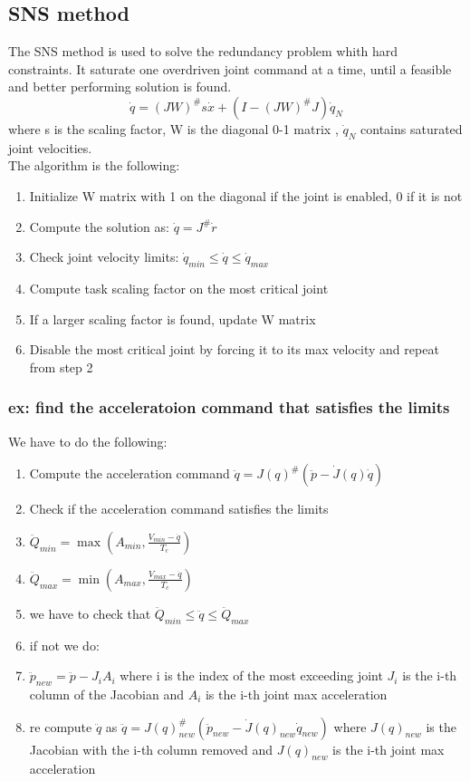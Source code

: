 \documentclass[a4paper,12pt]{article}
\begin{document}
\subsection{SNS method}
The SNS method is used to solve the redundancy 
problem whith hard constraints. It saturate one overdriven joint command at a time, until a feasible and better
performing solution is found.
\begin{equation}
    \dot{q} = (JW)^{\#} s\dot{x} + (I - (JW)^{\#}J) \dot{q}_N
\end{equation}
where s is the scaling factor,  W is the diagonal 0-1 matrix
 , $\dot{q}_N$ contains
 saturated
 joint velocities.\\
The algorithm is the following:
\begin{enumerate}
    \item Initialize W matrix with 1 on the diagonal if the joint is enabled, 0 if it is not
    \item Compute the solution as: $\dot{q} = J^\# \dot{r}$
    \item Check joint velocity limits: $\dot{q}_{min} \leq \dot{q} \leq \dot{q}_{max}$
    \item Compute task scaling factor on the most critical joint
    \item If a larger scaling factor is found, update W matrix
    \item Disable the most critical joint by forcing it to its max velocity and repeat from step 2
\end{enumerate}
    \subsubsection{ex: find the acceleratoion command that satisfies the limits}
We have to do the following:
\begin{enumerate}
    \item Compute the acceleration command $\ddot{q}=J(q)^{\#}(\ddot{p}-\dot{J}(q)\dot{q})$
    \item Check if the acceleration command satisfies the limits
    \item $\ddot{Q}_{min}= \max(A_{min}, \frac{V_{min}-\dot{q}}{T_c})$
    \item $\ddot{Q}_{max}= \min(A_{max}, \frac{V_{max}-\dot{q}}{T_c})$
    \item we have to check that $\ddot{Q}_{min} \leq \ddot{q} \leq \ddot{Q}_{max}$
    \item if not we do:
    \item $\ddot{p}_{new} = \ddot{p} - J_i A_i$ where i is the 
    index of the most exceeding joint $J_i$ is the i-th column of the Jacobian and $A_i$ is the i-th joint max acceleration
    \item re compute $\ddot{q}$ as $\ddot{q}=J(q)^{\#}_{new}(\ddot{p}_{new}-\dot{J}(q)_{new}\dot{q}_{new})$ where 
    $J(q)_{new}$ is the Jacobian with the i-th column removed and $J(q)_{new}$ is the i-th joint max acceleration
\end{enumerate}
\end{document}
